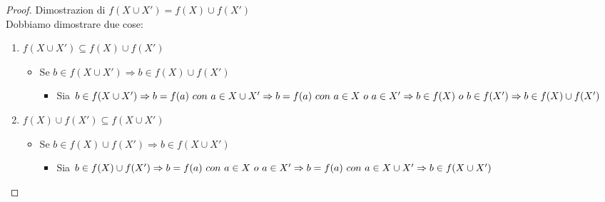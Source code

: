 \documentclass[12pt, letterpaper]{report}
\begin{document}
	\begin{proof}{Dimostrazion di $f(X \cup X') {=} f(X) \cup f(X')$} \quad \\
		Dobbiamo dimostrare due cose:
		\begin{enumerate}
			\item $f(X \cup X') \subseteq f(X) \cup f(X')$
				\begin{itemize}
					\item Se $b \in f(X \cup X') \Rightarrow b \in f(X) \cup f(X')$
					\begin{itemize}
						\item Sia $b \in f(X \cup X') \\ \Rightarrow b = f(a) \ con \ a \in X \cup X' \\ \Rightarrow b = f(a) \ con \ a \in X \ o \ a \in X' \\ \Rightarrow b \in f(X) \ o \ b \in f(X') \\ \Rightarrow b \in f(X) \cup f(X')$
					\end{itemize}

				\end{itemize}
			\item $f(X) \cup f(X') \subseteq f(X \cup X')$
				\begin{itemize}
					\item Se $b \in f(X) \cup f(X') \Rightarrow b \in f(X \cup X')$
					\begin{itemize}
						\item Sia $b \in f(X) \cup f(X') \\ \Rightarrow b = f(a) \ con \ a \in X \ o \ a \in X' \\ \Rightarrow b = f(a) \ con \ a \in X \cup X' \\ \Rightarrow b \in f(X \cup X')$
					\end{itemize}
				\end{itemize}
		\end{enumerate}
	\end{proof}
\end{document}
